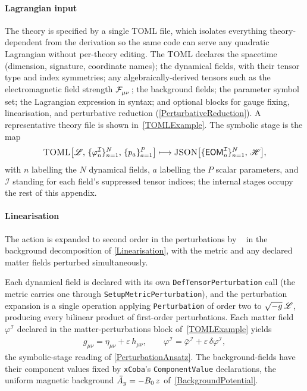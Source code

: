 \paragraph*{Lagrangian input}
The theory is specified by a single TOML file, which isolates
everything theory-dependent from the derivation so the same code can
serve any quadratic Lagrangian without per-theory editing.
The TOML declares the spacetime (dimension, signature, coordinate
names); the dynamical fields, with their tensor type and index
symmetries; any algebraically-derived tensors such as the
electromagnetic field strength $\FieldF{_\mu_\nu}$; the background
fields; the parameter symbol set; the Lagrangian expression in
\xAct{} syntax; and optional blocks for gauge fixing, linearisation,
and perturbative reduction (\cref{PerturbativeReduction}).
A representative theory file is shown in~\cref{TOMLExample}.
The symbolic stage is the map
\begin{align*}
  \textsc{TOML} \bigl[\mathscr{L},\,\{\varphi^{\mathcal{I}}_n\}_{n=1}^{N},
                     \,\{p_a\}_{a=1}^{P}\bigr]
  \longmapsto
  \textsc{JSON} \bigl[\{\textsf{EOM}^{\mathcal{I}}_n\}_{n=1}^{N},
                     \,\mathscr{H}\bigr],
\end{align*}
with $n$ labelling the $N$ dynamical fields, $a$ labelling the $P$
scalar parameters, and $\mathcal{I}$ standing for each field's
suppressed tensor indices; the internal stages occupy the rest of this appendix.

\paragraph*{Linearisation}
The action is expanded to second order in the perturbations by
\xPert{}~\cite{brizuela2009xpert} in the background decomposition of
\cref{Linearisation}, with the metric and any declared matter fields perturbed
simultaneously.

Each dynamical field is declared with its own
\texttt{DefTensorPerturbation} call (the metric carries one through
\texttt{SetupMetricPerturbation}), and the perturbation expansion is a
single operation applying \texttt{Perturbation} of
order two to $\sqrt{-g}\,\mathscr{L}$, producing every bilinear product of
first-order perturbations.
Each matter field $\varphi^{\mathcal{I}}$ declared in the
matter-perturbations block of~\cref{TOMLExample} yields
\begin{align}
  g_{\mu\nu} = \eta_{\mu\nu} + \varepsilon\,h_{\mu\nu},
  \qquad
  \varphi^{\mathcal{I}} = \bar{\varphi}^{\mathcal{I}}
                          + \varepsilon\,\delta\varphi^{\mathcal{I}},
  \label{MultiFieldPerturbation}
\end{align}
the symbolic-stage reading of
\cref{PerturbationAnsatz}.
The background-fields have their component values fixed by
\texttt{xCoba}'s \texttt{ComponentValue} declarations, \eg
the uniform magnetic background
$\bar{A}_y = -B_0\,z$ of~\cref{BackgroundPotential}.

